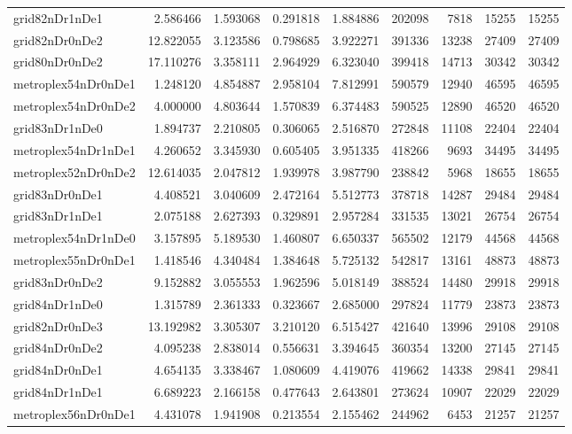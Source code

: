 \begin{longtable}{|l|r|r|r|r|r|r|r|r|}
grid82nDr1nDe1 & 2.586466 & 1.593068 & 0.291818 & 1.884886 & 202098 & 7818 & 15255 & 15255 \\
grid82nDr0nDe2 & 12.822055 & 3.123586 & 0.798685 & 3.922271 & 391336 & 13238 & 27409 & 27409 \\
grid80nDr0nDe2 & 17.110276 & 3.358111 & 2.964929 & 6.323040 & 399418 & 14713 & 30342 & 30342 \\
metroplex54nDr0nDe1 & 1.248120 & 4.854887 & 2.958104 & 7.812991 & 590579 & 12940 & 46595 & 46595 \\
metroplex54nDr0nDe2 & 4.000000 & 4.803644 & 1.570839 & 6.374483 & 590525 & 12890 & 46520 & 46520 \\
grid83nDr1nDe0 & 1.894737 & 2.210805 & 0.306065 & 2.516870 & 272848 & 11108 & 22404 & 22404 \\
metroplex54nDr1nDe1 & 4.260652 & 3.345930 & 0.605405 & 3.951335 & 418266 & 9693 & 34495 & 34495 \\
metroplex52nDr0nDe2 & 12.614035 & 2.047812 & 1.939978 & 3.987790 & 238842 & 5968 & 18655 & 18655 \\
grid83nDr0nDe1 & 4.408521 & 3.040609 & 2.472164 & 5.512773 & 378718 & 14287 & 29484 & 29484 \\
grid83nDr1nDe1 & 2.075188 & 2.627393 & 0.329891 & 2.957284 & 331535 & 13021 & 26754 & 26754 \\
metroplex54nDr1nDe0 & 3.157895 & 5.189530 & 1.460807 & 6.650337 & 565502 & 12179 & 44568 & 44568 \\
metroplex55nDr0nDe1 & 1.418546 & 4.340484 & 1.384648 & 5.725132 & 542817 & 13161 & 48873 & 48873 \\
grid83nDr0nDe2 & 9.152882 & 3.055553 & 1.962596 & 5.018149 & 388524 & 14480 & 29918 & 29918 \\
grid84nDr1nDe0 & 1.315789 & 2.361333 & 0.323667 & 2.685000 & 297824 & 11779 & 23873 & 23873 \\
grid82nDr0nDe3 & 13.192982 & 3.305307 & 3.210120 & 6.515427 & 421640 & 13996 & 29108 & 29108 \\
grid84nDr0nDe2 & 4.095238 & 2.838014 & 0.556631 & 3.394645 & 360354 & 13200 & 27145 & 27145 \\
grid84nDr0nDe1 & 4.654135 & 3.338467 & 1.080609 & 4.419076 & 419662 & 14338 & 29841 & 29841 \\
grid84nDr1nDe1 & 6.689223 & 2.166158 & 0.477643 & 2.643801 & 273624 & 10907 & 22029 & 22029 \\
metroplex56nDr0nDe1 & 4.431078 & 1.941908 & 0.213554 & 2.155462 & 244962 & 6453 & 21257 & 21257 \\

\end{longtable}
